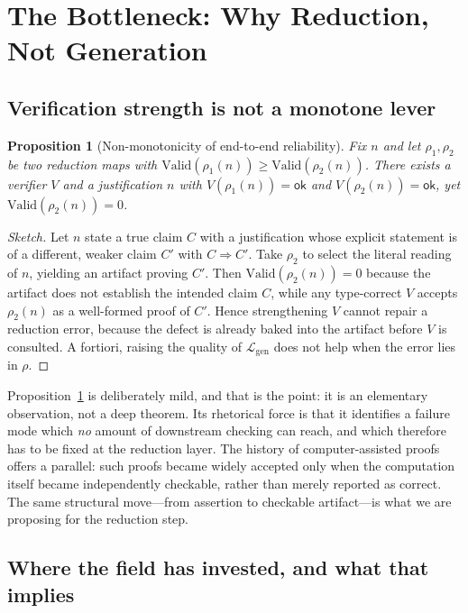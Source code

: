 \documentclass[11pt,a4paper]{article}
\theoremstyle{plain}
\newtheorem{proposition}{Proposition}
\theoremstyle{definition}
\newcommand{\OK}{\ensuremath{\mathsf{ok}}}      %
\newcommand{\LayerG}{\mathcal{L}_{\mathrm{gen}}}
\begin{document}
\section{The Bottleneck: Why Reduction, Not Generation}
\label{sec:bottleneck}

\subsection{Verification strength is not a monotone lever}

\begin{proposition}[Non-monotonicity of end-to-end reliability]
\label{prop:nonmonotone}
Fix $n$ and let $\rho_1,\rho_2$ be two reduction maps with
$\mathrm{Valid}(\rho_1(n))\geq\mathrm{Valid}(\rho_2(n))$. There exists a
verifier $V$ and a justification $n$ with $V(\rho_1(n))=\OK$ and
$V(\rho_2(n))=\OK$, yet $\mathrm{Valid}(\rho_2(n))=0$.
\end{proposition}

\begin{proof}[Sketch]
Let $n$ state a true claim $C$ with a justification whose explicit
statement is of a different, weaker claim $C'$ with $C\Rightarrow C'$. Take
$\rho_2$ to select the literal reading of $n$, yielding an artifact proving
$C'$. Then $\mathrm{Valid}(\rho_2(n))=0$ because the artifact does not
establish the intended claim $C$, while any type-correct $V$ accepts
$\rho_2(n)$ as a well-formed proof of $C'$. Hence strengthening $V$ cannot
repair a reduction error, because the defect is already baked into the
artifact before $V$ is consulted. A fortiori, raising the quality of
$\LayerG$ does not help when the error lies in $\rho$.
\end{proof}

Proposition~\ref{prop:nonmonotone} is deliberately mild, and that is the
point: it is an elementary observation, not a deep theorem. Its rhetorical
force is that it identifies a failure mode which \emph{no} amount of
downstream checking can reach, and which therefore has to be fixed at the
reduction layer. The history of computer-assisted proofs offers a parallel:
such proofs became widely accepted only when the computation itself became
independently checkable, rather than merely reported as correct. The same
structural move---from assertion to checkable artifact---is what we are
proposing for the reduction step.

\subsection{Where the field has invested, and what that implies}
\end{document}
